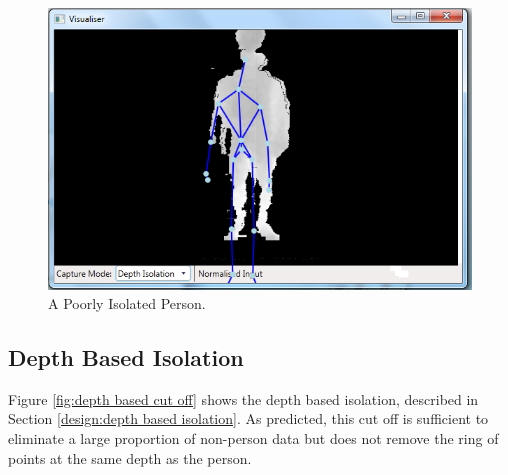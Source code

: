 \begin{figure}[h]
\begin{center}
\includegraphics[scale=0.8]{./testing/parse5} 
\end{center}
\caption{A Poorly Isolated Person.}
\label{fig:a poorly isolated person}
\end{figure} 

\subsection{Depth Based Isolation}
\label{testing:depth based isolation}
Figure \ref{fig:depth based cut off} shows the depth based isolation, described in Section \ref{design:depth based isolation}. As predicted, this cut off is sufficient to eliminate a large proportion of non-person data but does not remove the ring of points at the same depth as the person.\\

